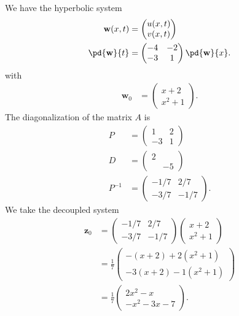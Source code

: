 \documentclass[10pt]{mypackage}
\begin{document}
\begin{solution}
  We have the hyperbolic system
  \begin{align*}
    \mathbf{w}(x,t) &= \begin{pmatrix}u(x,t)\\v(x,t)\end{pmatrix}\\
    \pd{\mathbf{w}}{t} &= \begin{pmatrix}-4 & -2 \\ -3 & 1\end{pmatrix} \pd{\mathbf{w}}{x}.
  \end{align*}
  with
  \begin{align*}
    \mathbf{w}_0 &= \begin{pmatrix}x+2\\x^2 + 1\end{pmatrix}.
  \end{align*}
  The diagonalization of the matrix $A$ is
  \begin{align*}
    P &= \begin{pmatrix}1 & 2 \\ -3 & 1\end{pmatrix}\\
    D &= \begin{pmatrix}2 & \\ & -5\end{pmatrix}\\
    P^{-1} &= \begin{pmatrix}-1/7 & 2/7\\-3/7 & -1/7\end{pmatrix}.
  \end{align*}
  We take the decoupled system
  \begin{align*}
    \mathbf{z}_0 &= \begin{pmatrix}-1/7 & 2/7\\-3/7 & -1/7\end{pmatrix} \begin{pmatrix}x+ 2\\x^2 + 1\end{pmatrix}\\
                 &= \frac{1}{7} \begin{pmatrix}-(x+2) + 2\left( x^2 + 1 \right)\\ -3(x+2) - 1(x^2 + 1)\end{pmatrix}\\
                 &= \frac{1}{7} \begin{pmatrix}2x^2-x\\ -x^2-3x-7\end{pmatrix}.

\end{align*}
\end{solution}
\end{document}
